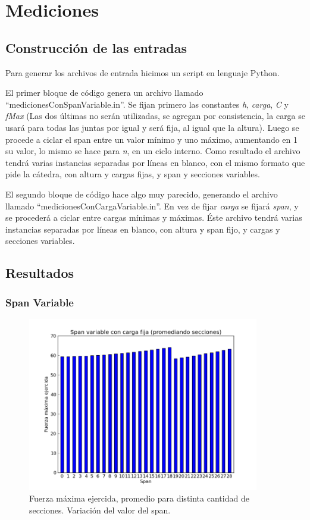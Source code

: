 \section{Mediciones}

\subsection{Construcción de las entradas}

Para generar los archivos de entrada hicimos un script en lenguaje Python.

El primer bloque de código genera un archivo llamado ``medicionesConSpanVariable.in''. Se fijan primero las constantes \emph{h}, \emph{carga}, \emph{C} y \emph{fMax}
(Las dos últimas no serán utilizadas, se agregan por consistencia, la carga se usará para todas las juntas por igual y será fija, al igual que la altura). 
Luego se procede a ciclar el span entre un valor mínimo y uno máximo, aumentando en 1 su valor, lo mismo se hace para \emph{n}, en un ciclo interno. 
Como resultado el archivo tendrá varias instancias separadas por líneas en blanco, con el mismo formato que pide la cátedra, con altura y cargas fijas, y span y secciones variables.

El segundo bloque de código hace algo muy parecido, generando el archivo llamado ``medicionesConCargaVariable.in''. En vez de fijar \emph{carga} se fijará \emph{span}, y se
procederá a ciclar entre cargas mínimas y máximas.
Éste archivo tendrá varias instancias separadas por líneas en blanco, con altura y span fijo, y cargas y secciones variables.


\subsection{Resultados}

\subsubsection{Span Variable}

\begin{figure}[H]
  \centering
    \includegraphics[width=0.9\textwidth]{../mediciones/spanVariable.png}
    \caption{Fuerza máxima ejercida, promedio para distinta cantidad de secciones. Variación del valor del span.}
    \label{graf:span}
\end{figure}

